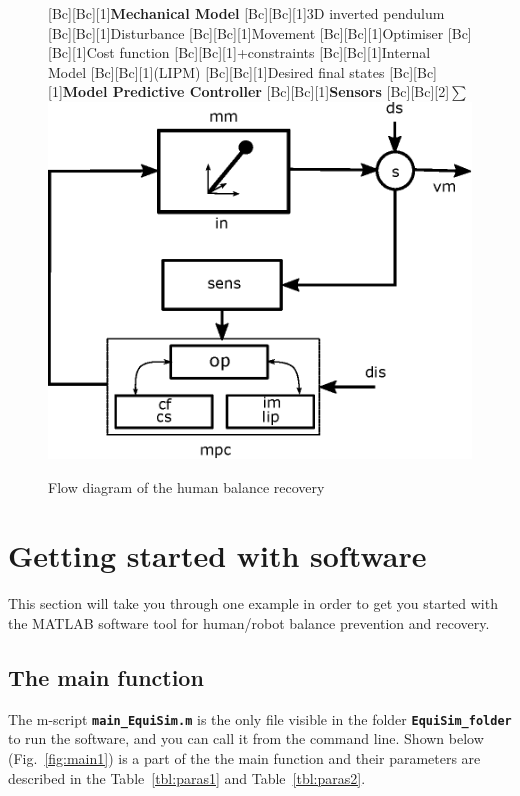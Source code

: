 \documentclass[12pt,oneside,notitlepage,abstracton,a4paper]{scrartcl}
\begin{document}
\begin{figure}[ht]   %
\centering 
{}[Bc][Bc][1]{\footnotesize \textbf{Mechanical Model}}   
[Bc][Bc][1]{\footnotesize 3D inverted pendulum}
[Bc][Bc][1]{\footnotesize Disturbance}
[Bc][Bc][1]{\footnotesize Movement}
[Bc][Bc][1]{\footnotesize Optimiser}   
[Bc][Bc][1]{\footnotesize Cost function} 
[Bc][Bc][1]{\footnotesize +constraints} 
[Bc][Bc][1]{\footnotesize Internal Model}  
[Bc][Bc][1]{\footnotesize (LIPM)}  
[Bc][Bc][1]{\footnotesize Desired final states}  
[Bc][Bc][1]{\footnotesize \textbf{Model Predictive Controller}} 
[Bc][Bc][1]{\footnotesize \textbf{Sensors}}   
[Bc][Bc][2]{\footnotesize \textbf{$\sum$}}    
\includegraphics[angle=0,width=.7\columnwidth]{images/control_scheme/control_scheme.eps}
\caption{Flow diagram of the human balance recovery}\label{fig:control_scheme}
\end{figure} 

\clearpage
\newpage
\section{Getting started with software}\label{Getting}
This section will take you through one example in order to get you started with 
the MATLAB software tool for human/robot balance prevention and recovery.

\subsection{The main function}
 The m-script \textbf{\texttt{main\_EquiSim.m}} is the only file visible in the folder \textbf{\texttt{EquiSim\_folder}} to run the software, and you can call it from the command line. Shown below (Fig.~\ref{fig:main1}) is a part of the the main function and their parameters are described in the Table~\ref{tbl:paras1} and Table~\ref{tbl:paras2}.
 
\end{document}
